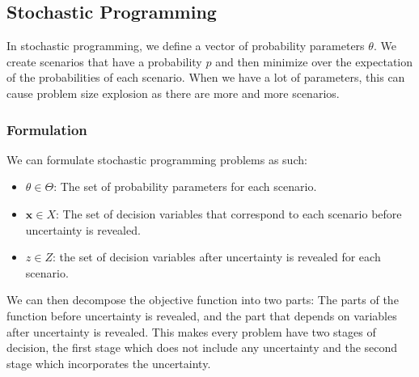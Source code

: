 \subsection{Stochastic Programming}
In stochastic programming, we define a vector of probability parameters $\theta$.
We create scenarios that have a probability $p$ and then minimize over the expectation of the probabilities of each scenario.
When we have a lot of parameters, this can cause problem size explosion as there are more and more scenarios.

\subsubsection{Formulation}
We can formulate stochastic programming problems as such:

\begin{itemize}
    \item $\theta \in \Theta$: The set of probability parameters for each scenario.
    \item $\textbf{x} \in X$: The set of decision variables that correspond to each scenario before uncertainty is revealed.
    \item $z \in Z$: the set of decision variables after uncertainty is revealed for each scenario.
\end{itemize}
We can then decompose the objective function into two parts: The parts of the function before uncertainty is revealed, and the part that depends on variables after uncertainty is revealed.
This makes every problem have two stages of decision, the first stage which does not include any uncertainty and the second stage which incorporates the uncertainty.